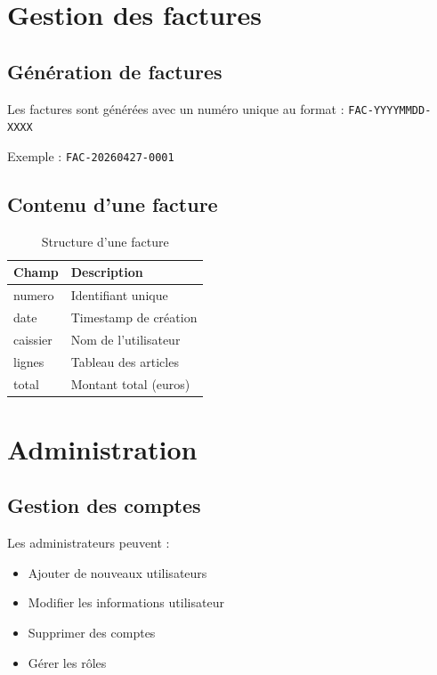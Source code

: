 \documentclass[12pt,a4paper,french]{report}
\begin{document}
\section{Gestion des factures}

\subsection{Génération de factures}

Les factures sont générées avec un numéro unique au format : \texttt{FAC-YYYYMMDD-XXXX}

Exemple : \texttt{FAC-20260427-0001}

\subsection{Contenu d'une facture}

\begin{table}[H]
\centering
\begin{tabular}{|l|l|}
\hline
\textbf{Champ} & \textbf{Description} \\
\hline
numero & Identifiant unique \\
date & Timestamp de création \\
caissier & Nom de l'utilisateur \\
lignes & Tableau des articles \\
total & Montant total (euros) \\
\hline
\end{tabular}
\caption{Structure d'une facture}
\end{table}

\section{Administration}

\subsection{Gestion des comptes}

Les administrateurs peuvent :

\begin{itemize}
    \item Ajouter de nouveaux utilisateurs
    \item Modifier les informations utilisateur
    \item Supprimer des comptes
    \item Gérer les rôles
\end{itemize}
\end{document}
